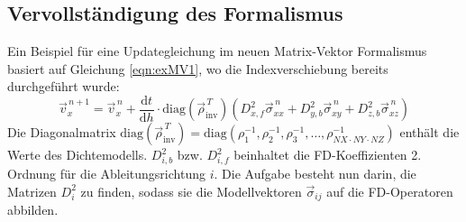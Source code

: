 \documentclass[pdftex,a4paper,parskip,listof=totoc,bibliography=totoc,onehalfspacing,12pt]{scrreprt}
\begin{document}
\subsection{Vervollständigung des Formalismus}

Ein Beispiel für eine Updategleichung im neuen Matrix-Vektor Formalismus basiert auf Gleichung \ref{eqn:exMV1}, wo die Indexverschiebung bereits durchgeführt wurde:
\begin{equation}
	\vec{v}_x^{\,n+1} = \vec{v}_x^{\,n} + \frac{\mathrm{d}t}{\mathrm{d}h} \cdot \mathrm{diag} \left( \vec{\rho}_\mathrm{inv}^{\,T} \right) \left( D_{x,f}^2 \vec{\sigma}_{xx}^{\,n} + D_{y,b}^2 \vec{\sigma}_{xy}^{\,n} + D_{z,b}^2 \vec{\sigma}_{xz}^{\,n} \right)\label{eqn:exMV2}
\end{equation}
Die Diagonalmatrix $\mathrm{diag} \left( \vec{\rho}_\mathrm{inv}^{\,T} \right) = \mathrm{diag} \left( \rho_1^{-1}, \rho_2^{-1}, \rho_3^{-1}, \dots , \rho_{NX \cdot NY \cdot NZ}^{-1} \right)$ enthält die Werte des Dichtemodells. $D_{i,b}^2$ bzw. $D_{i,f}^2$  beinhaltet die FD-Koeffizienten 2. Ordnung für die Ableitungsrichtung $i$. Die Aufgabe besteht nun darin, die Matrizen $D_{i}^2$ zu finden, sodass sie die Modellvektoren $\vec{\sigma}_{ij}$ auf die FD-Operatoren abbilden. 
\end{document}
